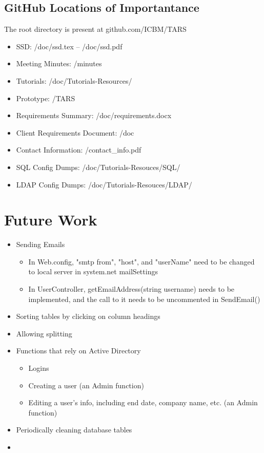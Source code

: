 \documentclass[letterpaper]{article}
\begin{document}
\subsection{GitHub Locations of Importantance}
The root directory is present at github.com/ICBM/TARS
\begin{itemize}
  \item SSD: /doc/ssd.tex -- /doc/ssd.pdf
  \item Meeting Minutes: /minutes
  \item Tutorials: /doc/Tutorials-Resources/
  \item Prototype: /TARS
  \item Requirements Summary: /doc/requirements.docx
  \item Client Requirements Document: /doc
  \item Contact Information: /contact\_info.pdf
  \item SQL Config Dumps: /doc/Tutorials-Resouces/SQL/
  \item LDAP Config Dumps: /doc/Tutorials-Resouces/LDAP/
\end{itemize}


\section{Future Work}
\begin{itemize}
\item Sending Emails
	\begin{itemize}
	\item In Web.config, "smtp from", "host", and "userName" need to be changed to local server in system.net mailSettings
	\item In UserController, getEmailAddress(string username) needs to be implemented, and the call to it needs to be uncommented in SendEmail()
	\end{itemize}
\item Sorting tables by clicking on column headings
\item Allowing splitting %
\item Functions that rely on Active Directory  
	\begin{itemize}
	\item Logins
	\item Creating a user (an Admin function)
	\item Editing a user's info, including end date, company name, etc. (an Admin function)
	\end{itemize}
\item Periodically cleaning database tables
\item 
\end{itemize}
\end{document}
